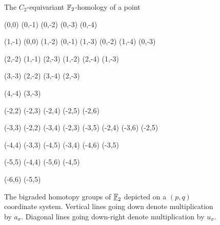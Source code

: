 \begin{figure}[t]
  \centering
  The $C_2$-equivariant $\operatorname{\mathbb{F}}_2$-homology of a point \\\vspace{6pt}
  \begin{sseqpage}[ xscale=0.8, yscale=0.8, x range = {-5}{3}, y range = {-3}{5}, tick step = 2, major tick step=2, minor tick step= 1, class labels = {left}, classes = fill, grid = chess, axes type = frame ]
    \class["1" above](0,0)
    \class["a_\sigma"](0,-1) \structline
    \class(0,-2) \structline
    \class(0,-3) \structline
    \class(0,-4) \structline
    
    (1,-1) \structline(0,0)
    \class(1,-2) \structline \structline(0,-1)
    \class(1,-3) \structline \structline(0,-2)
    \class(1,-4) \structline \structline(0,-3)
    
    \class(2,-2) \structline(1,-1)
    \class(2,-3) \structline \structline(1,-2)
    \class(2,-4) \structline \structline(1,-3)
    
    \class(3,-3) \structline(2,-2)
    \class(3,-4) \structline \structline(2,-3)
    
    \class(4,-4) \structline(3,-3)
    
    (-2,2)
    \class(-2,3) \structline
    \class(-2,4) \structline
    \class(-2,5) \structline
    \class(-2,6) \structline
    
    \class(-3,3) \structline(-2,2)
    \class(-3,4) \structline \structline(-2,3)
    \class(-3,5) \structline \structline(-2,4)
    \class(-3,6) \structline \structline(-2,5)
    
    \class(-4,4) \structline(-3,3)
    \class(-4,5) \structline \structline(-3,4)
    \class(-4,6) \structline \structline(-3,5)
    
    \class(-5,5) \structline(-4,4)
    \class(-5,6) \structline \structline(-4,5)
    
    \class(-6,6) \structline(-5,5)
    
  \end{sseqpage}
  \caption{ {\footnotesize
      The bigraded homotopy groups of $\underline{\operatorname{\mathbb{F}}}_2$ depicted on a $(p,q)$ coordinate system.
      Vertical lines going down denote multiplication by $a_\sigma$.
      Diagonal lines going down-right denote multiplication by $u_{\sigma}$.}}
  \label{F2-fig}
\end{figure}

